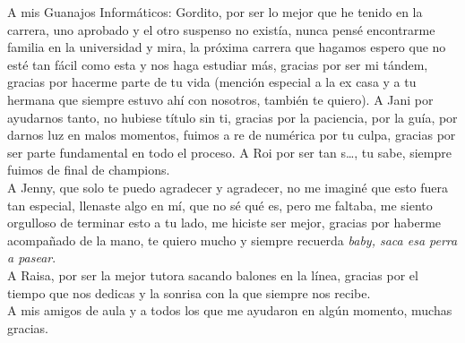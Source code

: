 A mis Guanajos Informáticos: Gordito, por ser lo mejor que he tenido en la carrera, uno aprobado y el otro suspenso no existía, nunca pensé encontrarme familia en la universidad y mira, la próxima carrera que hagamos espero que no esté tan fácil como esta y nos haga estudiar más, gracias por ser mi tándem, gracias por hacerme parte de tu vida (mención especial a la ex casa y a tu hermana que siempre estuvo ahí con nosotros, también te quiero). A Jani por ayudarnos tanto, no hubiese título sin ti, gracias por la paciencia, por la guía, por darnos luz en malos momentos, fuimos a re de numérica por tu culpa, gracias por ser parte fundamental en todo el proceso. A Roi por ser tan s…, tu sabe, siempre fuimos de final de champions. \\
A Jenny, que solo te puedo agradecer y agradecer, no me imaginé que esto fuera tan especial, llenaste algo en mí, que no sé qué es, pero me faltaba, me siento orgulloso de terminar esto a tu lado, me hiciste ser mejor, gracias por haberme acompañado de la mano, te quiero mucho y siempre recuerda \emph{baby, saca esa perra a pasear}. \\
A Raisa, por ser la mejor tutora sacando balones en la línea, gracias por el tiempo que nos dedicas y la sonrisa con la que siempre nos recibe. \\
A mis amigos de aula y a todos los que me ayudaron en algún momento, muchas gracias. \\

